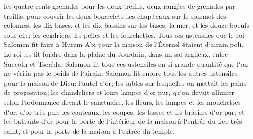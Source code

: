 \verse les quatre cents grenades pour les deux treillis, deux rangées de grenades par treillis, pour couvrir les deux bourrelets des chapiteaux sur le sommet des colonnes; 
\verse les dix bases, et les dix bassins sur les bases; 
\verse la mer, et les douze boeufs sous elle; 
\verse les cendriers, les pelles et les fourchettes. Tous ces ustensiles que le roi Salomon fit faire à Huram Abi pour la maison de l`Éternel étaient d`airain poli. 
\verse Le roi les fit fondre dans la plaine du Jourdain, dans un sol argileux, entre Succoth et Tseréda. 
\verse Salomon fit tous ces ustensiles en si grande quantité que l`on ne vérifia pas le poids de l`airain. 
\verse Salomon fit encore tous les autres ustensiles pour la maison de Dieu: l`autel d`or; les tables sur lesquelles on mettait les pains de proposition; 
\verse les chandeliers et leurs lampes d`or pur, qu`on devait allumer selon l`ordonnance devant le sanctuaire, 
\verse les fleurs, les lampes et les mouchettes d`or, d`or très pur; 
\verse les couteaux, les coupes, les tasses et les brasiers d`or pur; et les battants d`or pour la porte de l`intérieur de la maison à l`entrée du lieu très saint, et pour la porte de la maison à l`entrée du temple. 

